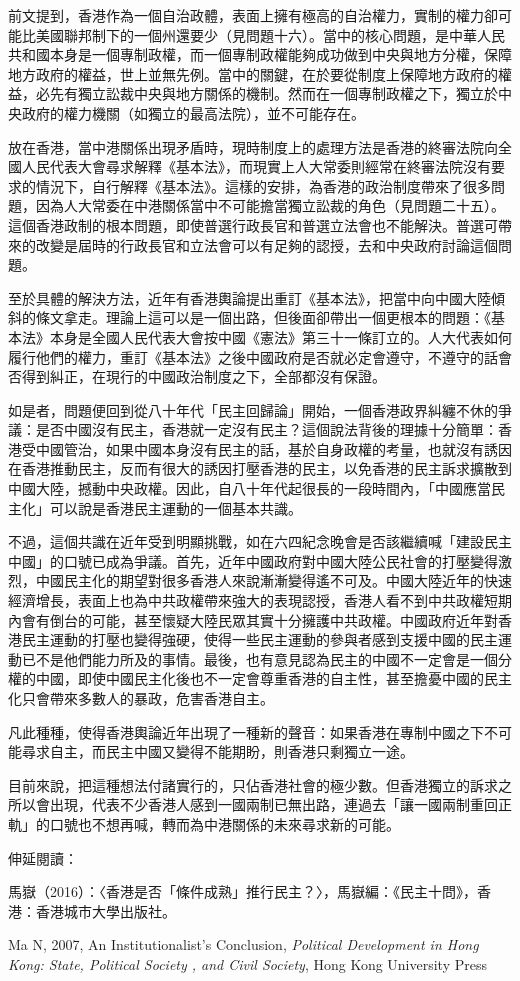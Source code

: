 前文提到，香港作為一個自治政體，表面上擁有極高的自治權力，實制的權力卻可能比美國聯邦制下的一個州還要少（見問題十六）。當中的核心問題，是中華人民共和國本身是一個專制政權，而一個專制政權能夠成功做到中央與地方分權，保障地方政府的權益，世上並無先例。當中的關鍵，在於要從制度上保障地方政府的權益，必先有獨立訟裁中央與地方關係的機制。然而在一個專制政權之下，獨立於中央政府的權力機關（如獨立的最高法院），並不可能存在。

放在香港，當中港關係出現矛盾時，現時制度上的處理方法是香港的終審法院向全國人民代表大會尋求解釋《基本法》，而現實上人大常委則經常在終審法院沒有要求的情況下，自行解釋《基本法》。這樣的安排，為香港的政治制度帶來了很多問題，因為人大常委在中港關係當中不可能擔當獨立訟裁的角色（見問題二十五）。這個香港政制的根本問題，即使普選行政長官和普選立法會也不能解決。普選可帶來的改變是屆時的行政長官和立法會可以有足夠的認授，去和中央政府討論這個問題。

至於具體的解決方法，近年有香港輿論提出重訂《基本法》，把當中向中國大陸傾斜的條文拿走。理論上這可以是一個出路，但後面卻帶出一個更根本的問題：《基本法》本身是全國人民代表大會按中國《憲法》第三十一條訂立的。人大代表如何履行他們的權力，重訂《基本法》之後中國政府是否就必定會遵守，不遵守的話會否得到糾正，在現行的中國政治制度之下，全部都沒有保證。

如是者，問題便回到從八十年代「民主回歸論」開始，一個香港政界糾纏不休的爭議：是否中國沒有民主，香港就一定沒有民主？這個說法背後的理據十分簡單：香港受中國管治，如果中國本身沒有民主的話，基於自身政權的考量，也就沒有誘因在香港推動民主，反而有很大的誘因打壓香港的民主，以免香港的民主訴求擴散到中國大陸，撼動中央政權。因此，自八十年代起很長的一段時間內，「中國應當民主化」可以說是香港民主運動的一個基本共識。

不過，這個共識在近年受到明顯挑戰，如在六四紀念晚會是否該繼續喊「建設民主中國」的口號已成為爭議。首先，近年中國政府對中國大陸公民社會的打壓變得激烈，中國民主化的期望對很多香港人來說漸漸變得遙不可及。中國大陸近年的快速經濟增長，表面上也為中共政權帶來強大的表現認授，香港人看不到中共政權短期內會有倒台的可能，甚至懷疑大陸民眾其實十分擁護中共政權。中國政府近年對香港民主運動的打壓也變得強硬，使得一些民主運動的參與者感到支援中國的民主運動已不是他們能力所及的事情。最後，也有意見認為民主的中國不一定會是一個分權的中國，即使中國民主化後也不一定會尊重香港的自主性，甚至擔憂中國的民主化只會帶來多數人的暴政，危害香港自主。

凡此種種，使得香港輿論近年出現了一種新的聲音：如果香港在專制中國之下不可能尋求自主，而民主中國又變得不能期盼，則香港只剩獨立一途。

目前來說，把這種想法付諸實行的，只佔香港社會的極少數。但香港獨立的訴求之所以會出現，代表不少香港人感到一國兩制已無出路，連過去「讓一國兩制重回正軌」的口號也不想再喊，轉而為中港關係的未來尋求新的可能。

伸延閱讀：

馬嶽（2016）：〈香港是否「條件成熟」推行民主？〉，馬嶽編：《民主十問》，香港：香港城市大學出版社。

Ma N, 2007, An Institutionalist’s Conclusion, \textit{Political Development in Hong Kong: State, Political Society , and Civil Society}, Hong Kong University Press